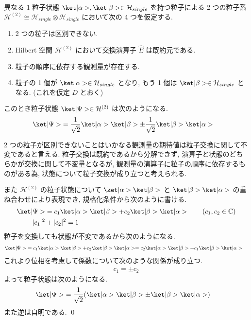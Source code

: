 \documentclass[uplatex,dvipdfmx,a4paper,11pt]{jlreq}
\makeatletter
\newcommand{\CC}{\mathbb{C}}
\newcommand{\HH}{\mathcal{H}}
\numberwithin{equation}{section}
\theoremstyle{definition}
\renewenvironment{proof}[1][\proofname]{\par
  \normalfont
  \topsep6\p@\@plus6\p@ \trivlist
  \item[\hskip\labelsep{\bfseries #1}\@addpunct{\bfseries}]\ignorespaces\quad\par
}{%
  \qed\endtrivlist\@endpefalse
}
\renewcommand\proofname{証明}
\makeatother
\begin{document}
\begin{theorem}[Q21-1(i)(viii)]
  異なる 1 粒子状態 $\ket|\alpha>,\ket|\beta>\in\HH_{single}$ を持つ粒子による 2 つの粒子系 $\HH^{(2)} \cong \HH_{single}\otimes\HH_{single}$ において次の 4 つを仮定する.
  \begin{enumerate}
    \item 2 つの粒子は区別できない.
    \item Hilbert 空間 $\HH^{(2)}$ において交換演算子 $\hat{E}$ は既約元である.
    \item 粒子の順序に依存する観測量が存在する.
    \item 粒子の 1 個が $\ket|\alpha>\in\HH_{single}$ となり, もう 1 個は $\ket|\beta>\in\HH_{single}$ となる. (これを仮定 $D$ とおく)
  \end{enumerate}
  このとき粒子状態 $\ket|\Psi>\in\HH^{(2)}$ は次のようになる.
  \begin{align}
    \ket|\Psi> & = \frac{1}{\sqrt{2}}\ket|\alpha>\ket|\beta> \pm \frac{1}{\sqrt{2}}\ket|\beta>\ket|\alpha>
  \end{align}
\end{theorem}
\begin{proof}
  2 つの粒子が区別できないことはいかなる観測量の期待値は粒子交換に関して不変であると言える. 粒子交換は既約であるから分解できず, 演算子と状態のどちらかが交換に関して不変量となるが, 観測量の演算子に粒子の順序に依存するものがある為, 状態について粒子交換が成り立つと考えられる.

  また $\HH^{(2)}$ の粒子状態について $\ket|\alpha>\ket|\beta>$ と $\ket|\beta>\ket|\alpha>$ の重ね合わせにより表現でき, 規格化条件から次のように書ける.
  \begin{align}
    \ket|\Psi> & = c_1\ket|\alpha>\ket|\beta> + c_2\ket|\beta>\ket|\alpha> \qquad (c_1, c_2\in\CC) \\
    |c_1|^2    & + |c_2|^2 = 1
  \end{align}
  粒子を交換しても状態が不変であるから次のようになる.
  \begin{align}
    \ket|\Psi> & = c_1\ket|\alpha>\ket|\beta> + c_2\ket|\beta>\ket|\alpha> = c_2\ket|\alpha>\ket|\beta> + c_1\ket|\beta>\ket|\alpha>
  \end{align}
  これより位相を考慮して係数について次のような関係が成り立つ.
  \begin{align}
    c_1 = \pm c_2
  \end{align}
  よって粒子状態は次のようになる.
  \begin{align}
    \ket|\Psi> & = \frac{1}{\sqrt{2}}(\ket|\alpha>\ket|\beta> \pm \ket|\beta>\ket|\alpha>)
  \end{align}
  また逆は自明である.
\end{proof}
\end{document}
